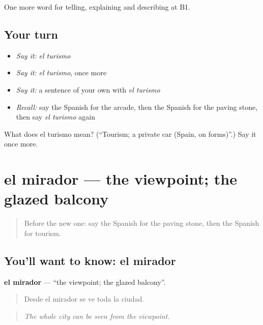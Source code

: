 \begin{grammarlens}[title={What you've built}]
One more word for telling, explaining and describing at B1.
\end{grammarlens}

\subsection*{Your turn}
\begin{itemize}
\raggedright
  \item \emph{Say it:} \emph{el turismo}
  \item \emph{Say it:} \emph{el turismo}, once more
  \item \emph{Say it:} a sentence of your own with \emph{el turismo}
  \item \emph{Recall:} say the Spanish for the arcade, then the Spanish for the paving stone, then say \emph{el turismo} again
\end{itemize}

\begin{tcolorbox}[breakable,colback=teal!4,colframe=teal!35!black,title={Before you move on}]
What does el turismo mean? (\textquotedblleft{}Tourism; a private car (Spain, on forms)\textquotedblright{}.) Say it once more.
\end{tcolorbox}
\section[el mirador]{el mirador — the viewpoint; the glazed balcony}

\label{lesson:ES-C676-mirador}



\begin{quote}
Before the new one: say the Spanish for the paving stone, then the Spanish for tourism.
\end{quote}

\subsection*{You'll want to know: el mirador}
\textbf{el mirador} — \textquotedblleft{}the viewpoint; the glazed balcony\textquotedblright{}.

\begin{quote}
Desde el mirador se ve toda la ciudad.
\end{quote}

\begin{quote}
\emph{The whole city can be seen from the viewpoint.}
\end{quote}


